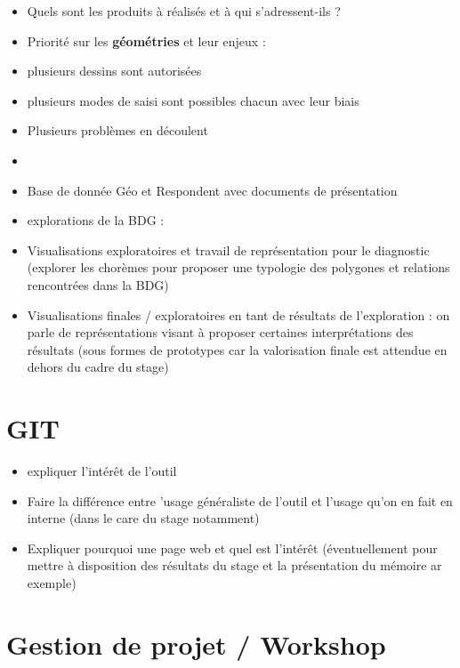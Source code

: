 \documentclass[
  a4paper,
]{scrbook}
\providecommand{\tightlist}{%
  \setlength{\itemsep}{0pt}\setlength{\parskip}{0pt}}\usepackage{longtable,booktabs,array}
\begin{document}
\begin{itemize}
\item
  Quels sont les produits à réalisés et à qui s'adressent-ils ?
\item
  Priorité sur les \textbf{géométries} et leur enjeux :
\item
  plusieurs dessins sont autorisées
\item
  plusieurs modes de saisi sont possibles chacun avec leur biais
\item
  Plusieurs problèmes en découlent
\item
\item
  Base de donnée Géo et Respondent avec documents de présentation
\item
  explorations de la BDG :
\item
  Visualisations exploratoires et travail de représentation pour le
  diagnostic (explorer les chorèmes pour proposer une typologie des
  polygones et relations rencontrées dans la BDG)
\item
  Visualisations finales / exploratoires en tant de résultats de
  l'exploration : on parle de représentations visant à proposer
  certaines interprétations des résultats (sous formes de prototypes car
  la valorisation finale est attendue en dehors du cadre du stage)
\end{itemize}

\hypertarget{git}{%
\section{GIT}\label{git}}

\begin{itemize}
\tightlist
\item
  expliquer l'intérêt de l'outil
\item
  Faire la différence entre 'usage généraliste de l'outil et l'usage
  qu'on en fait en interne (dans le care du stage notamment)
\item
  Expliquer pourquoi une page web et quel est l'intérêt (éventuellement
  pour mettre à disposition des résultats du stage et la présentation du
  mémoire ar exemple)
\end{itemize}

\hypertarget{gestion-de-projet-workshop}{%
\section{Gestion de projet /
Workshop}\label{gestion-de-projet-workshop}}
\end{document}
